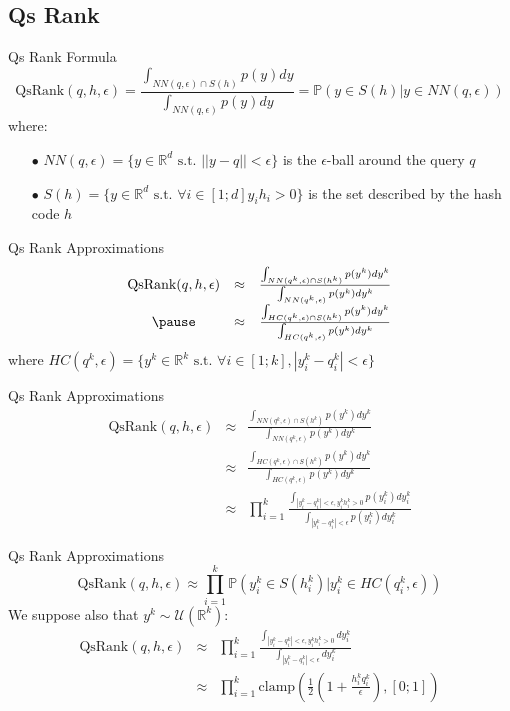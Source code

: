\documentclass[english]{beamer}
\newcommand{\RR}{\mathbb{R}}
\newcommand{\qr}{\textrm{QsRank}}
\theoremstyle{plain}
\theoremstyle{remark}
\begin{document}
\subsection{Qs Rank}

\begin{frame}{Qs Rank Formula}
\[
	\qr(q, h, \epsilon) = \frac{\int_{NN(q,\epsilon) \cap S(h)} p(y) dy}{\int_{NN(q,\epsilon)} p(y) dy} = \mathbb{P}(y \in S(h) | y\in NN(q,\epsilon))
\]
where:
\begin{enumerate}
	\item[$\bullet$]$NN(q,\epsilon) = \{y \in \RR^d \text{ s.t. } ||y-q||<\epsilon\}$ is the $\epsilon$-ball around the query $q$
	\item[$\bullet$]$S(h) = \{y \in \RR^d \text{ s.t. } \forall i \in [1;d] y_i h_i > 0 \}$ is the set described by the hash code $h$
\end{enumerate}
\end{frame}

\begin{frame}{Qs Rank Approximations}
\[
	\begin{array}{ccc}
	\qr(q, h, \epsilon) 
	& \approx & \frac{\int_{NN(q^k,\epsilon) \cap S(h^k)} p(y^k) dy^k}{\int_{NN(q^k,\epsilon)} p(y^k) dy^k}\\
	\pause
	& \approx & \frac{\int_{HC(q^k,\epsilon) \cap S(h^k)} p(y^k) dy^k}{\int_{HC(q^k,\epsilon)} p(y^k) dy^k}
	\end{array}
\]
where $HC(q^k,\epsilon) = \{y^k \in \RR^k \text{ s.t. } \forall i \in [1;k], |y^k_i-q^k_i|<\epsilon\}$
\end{frame}

\begin{frame}{Qs Rank Approximations}
\[
	\begin{array}{ccc}
	\qr(q, h, \epsilon) 
	& \approx & \frac{\int_{NN(q^k,\epsilon) \cap S(h^k)} p(y^k) dy^k}{\int_{NN(q^k,\epsilon)} p(y^k) dy^k}\\
	& \approx & \frac{\int_{HC(q^k,\epsilon) \cap S(h^k)} p(y^k) dy^k}{\int_{HC(q^k,\epsilon)} p(y^k) dy^k}\\
	& \approx & \prod_{i=1}^k \frac{\int_{|y^k_i - q^k_i| < \epsilon, y^k_i h^k_i > 0 } p(y^k_i) dy^k_i}{\int_{|y^k_i - q^k_i| < \epsilon} p(y^k_i) dy^k_i}
	\end{array}
\]
\end{frame}

\begin{frame}{Qs Rank Approximations}
\[
	\qr(q, h, \epsilon) \approx \prod_{i=1}^k \mathbb{P}(y^k_i \in S(h^k_i) | y^k_i \in HC(q^k_i,\epsilon))
\]
We suppose also that $y^k\sim \mathcal{U}(\RR^k)$:
\[
	\begin{array}{ccc}
	\qr(q, h, \epsilon) 
	& \approx & \prod_{i=1}^k \frac{\int_{|y^k_i - q^k_i| < \epsilon, y^k_i h^k_i > 0 } dy^k_i}{\int_{|y^k_i - q^k_i| < \epsilon} dy^k_i} \\
	& \approx & \prod_{i=1}^k \text{clamp} (\frac{1}{2}( 1 + \frac{h^k_i q^k_i}{\epsilon} ), [0;1] )                  
	\end{array}
\]
\end{frame}
\end{document}
